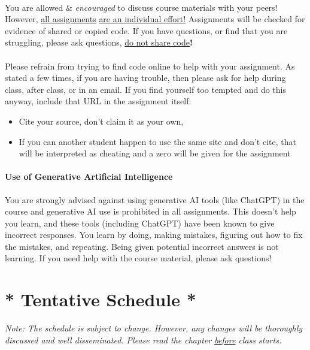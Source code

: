 \documentclass[letter,10pt]{article}
\begin{document}
\paragraph{}You are allowed \& \textit{encouraged} to discuss course materials with your peers! However, \underline{all assignments} \underline{are an individual effort!} Assignments will be checked for evidence of shared or copied code. If you have questions, or find that you are struggling, please ask questions, \underline{do not share code}\textbf{!}

\paragraph{}Please refrain from trying to find code online to help with your assignment. As stated a few times, if you are having trouble, then please ask for help during class, after class, or in an email. If you find yourself too tempted and do this anyway, include that URL in the assignment itself:
\begin{itemize}
\item Cite your source, don't claim it as your own,
\item If you can another student happen to use the same site and don't cite, that will be interpreted as cheating and a zero will be given for the assignment
\end{itemize}

\paragraph{Use of Generative Artificial Intelligence}You are strongly advised against using generative AI tools (like ChatGPT) in the course and generative AI use is prohibited in all assignments. This doesn't help you learn, and these tools (including ChatGPT) have been known to give incorrect responses. You learn by doing, making mistakes, figuring out how to fix the mistakes, and repeating. Being given potential incorrect answers is not learning. If you need help with the course material, please ask questions!

\newpage

\section*{* Tentative Schedule *}\label{sec:schedule}
\textit{Note: The schedule is subject to change. However, any changes will be thoroughly discussed and well disseminated. Please read the chapter \underline{before} class starts.}
\end{document}
